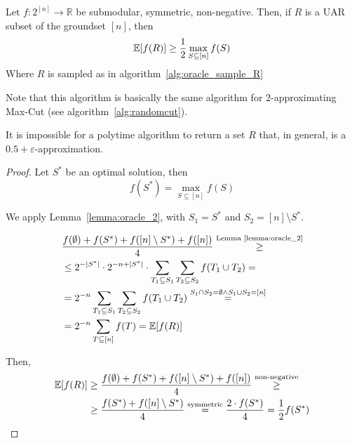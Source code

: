     \begin{theorem}\label{thm:oracle_r_uar}
        Let $f : 2^{[n]} \rightarrow \mathbb{R}$ be submodular, symmetric, non-negative.
        Then, if $R$ is a UAR subset of the groundset $[n]$, then
        \[ \mathbb{E}[f(R)] \geq \frac{1}{2} \max_{S \subseteq [n]} f(S) \]
        Where $R$ is sampled as in algorithm~\ref{alg:oracle_sample_R}
    \end{theorem}

    
    Note that this algorithm is basically the same algorithm for $2$-approximating Max-Cut (see algorithm~\ref{alg:randomcut}).

    It is impossible for a polytime algorithm to return a set $R$ that, in general, is a $0.5 + \varepsilon$-approximation.

    \begin{proof}
        Let $S^*$ be an optimal solution, then
        \[ f(S^*) = \max_{S \subseteq [n]} f(S) \]

        We apply Lemma~\ref{lemma:oracle_2}, with $S_1 = S^*$ and $S_2 = [n] \setminus S^*$.

        \begin{equation*}
            \begin{split}
                &\frac{f(\emptyset) + f(S^*) + f([n] \setminus S^*) + f([n])}{4} \overset{\text{Lemma~\ref{lemma:oracle_2}}}{\geq}\\
                &\leq 2^{- \vert S^* \vert} \cdot 2^{-n + \vert S^* \vert} \cdot \sum_{T_1 \subseteq S_1} \sum_{T_2 \subseteq S_2} f(T_1 \cup T_2) =\\
                &= 2^{-n} \sum_{T_1 \subseteq S_1} \sum_{T_2 \subseteq S_2} f(T_1 \cup T_2) \overset{S_1 \cap S_2 = \emptyset \wedge S_1 \cup S_2 = [n]}{=}\\
                &= 2^{-n} \sum_{T \subseteq [n]} f(T) = \mathbb{E}[f(R)]
            \end{split}
        \end{equation*}

        Then,
        \begin{equation*}
            \begin{split}
                \mathbb{E}[f(R)] &\geq \frac{f(\emptyset) + f(S^*) + f([n] \setminus S^*) + f([n])}{4} \overset{\text{non-negative}}{\geq}\\
                    &\geq \frac{f(S^*) + f([n] \setminus S^*)}{4} \overset{\text{symmetric}}{=} \frac{2 \cdot f(S^*)}{4} = \frac{1}{2} f(S^*)
            \end{split}
        \end{equation*}
    \end{proof}

